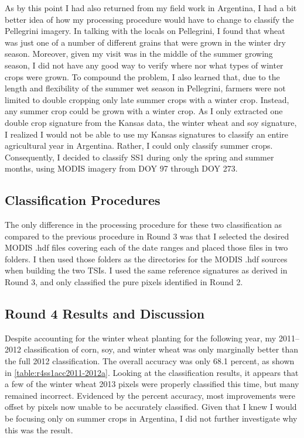 
As by this point I had also returned from my field work in Argentina, I had a bit better idea of how my processing procedure would have to change to classify the Pellegrini imagery. In talking with the locals on Pellegrini, I found that wheat was just one of a number of different grains that were grown in the winter dry season. Moreover, given my visit was in the middle of the summer growing season, I did not have any good way to verify where nor what types of winter crops were grown. To compound the problem, I also learned that, due to the length and flexibility of the summer wet season in Pellegrini, farmers were not limited to double cropping only late summer crops with a winter crop. Instead, any summer crop could be grown with a winter crop. As I only extracted one double crop signature from the Kansas data, the winter wheat and soy signature, I realized I would not be able to use my Kansas signatures to classify an entire agricultural year in Argentina. Rather, I could only classify summer crops. Consequently, I decided to classify SS1 during only the spring and summer months, using MODIS imagery from DOY 97 through DOY 273.

\subsection*{Classification Procedures}

The only difference in the processing procedure for these two classification as compared to the previous procedure in Round 3 was that I selected the desired MODIS .hdf files covering each of the date ranges and placed those files in two folders. I then used those folders as the directories for the MODIS .hdf sources when building the two TSIs. I used the same reference signatures as derived in Round 3, and only classified the pure pixels identified in Round 2.

\subsection*{Round 4 Results and Discussion}

Despite accounting for the winter wheat planting for the following year, my 2011--2012 classification of corn, soy, and winter wheat was only marginally better than the full 2012 classification. The overall accuracy was only 68.1 percent, as shown in \cref{table:r4ss1acc2011-2012a}. Looking at the classification results, it appears that a few of the winter wheat 2013 pixels were properly classified this time, but many remained incorrect. Evidenced by the percent accuracy, most improvements were offset by pixels now unable to be accurately classified. Given that I knew I would be focusing only on summer crops in Argentina, I did not further investigate why this was the result.

